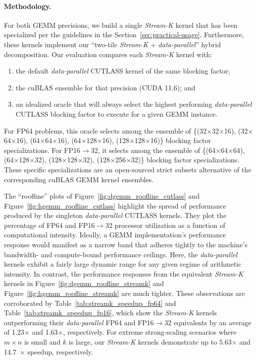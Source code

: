 \paragraph{Methodology.} For both GEMM precisions, we build a single \emph{Stream-K} kernel that has been specialized per the guidelines in the Section~\ref{sec:practical-usage}.
Furthermore, these kernels implement our ``two-tile \emph{Stream-K} +
\emph{data-parallel}'' hybrid decomposition. Our evaluation compares each \emph{Stream-K} kernel with:

\begin{enumerate}
    \item the default \emph{data-parallel} CUTLASS kernel of the same blocking factor;
    \item the cuBLAS ensemble for that precision (CUDA 11.6); and \item an idealized oracle that will always select the highest performing \emph{data-parallel} CUTLASS blocking factor to execute for a given GEMM instance.
\end{enumerate}

For FP64 problems, this oracle selects among the ensemble of \{(32$\times$32$\times$16), (32$\times$64$\times$16),
(64$\times$64$\times$16), (64$\times$128$\times$16), (128$\times$128$\times$16)\}
blocking factor specializations.  For FP16$\rightarrow$32, it selects among the ensemble of \{(64$\times$64$\times$64), (64$\times$128$\times$32),
(128$\times$128$\times$32), (128$\times$256$\times$32)\} blocking factor specializations. These specific specializations are an open-sourced strict subsets alternative of the corresponding cuBLAS GEMM kernel ensembles.

The ``roofline'' plots of Figure~\ref{fig:dgemm_roofline_cutlass} and
Figure~\ref{fig:hgemm_roofline_cutlass} highlight the spread of performance produced by the singleton \emph{data-parallel} CUTLASS kernels. They plot the percentage of FP64 and FP16$\rightarrow$32 processor utilization as a function of computational intensity. Ideally, a GEMM implementation's performance response would manifest as a narrow band that adheres tightly to the machine's bandwidth- and compute-bound performance ceilings. Here, the
\emph{data-parallel} kernels exhibit a fairly large dynamic range for any given regime of arithmetic intensity.  In contrast, the performance responses from the equivalent \emph{Stream-K} kernels in Figure~\ref{fig:dgemm_roofline_streamk}
and Figure~\ref{fig:hgemm_roofline_streamk} are much tighter. These observations are corroborated by Table~\ref{tab:streamk_speedup_fp64}
and Table~\ref{tab:streamk_speedup_fp16}, which show the \emph{Stream-K}
kernels outperforming their \emph{data-parallel} FP64 and FP16$\rightarrow$32
equivalents by an average of 1.23$\times$ and 1.63$\times$, respectively. For extreme strong-scaling scenarios where $m \times n$ is small and $k$ is large, our \emph{Stream-K} kernels demonstrate up to 5.63$\times$ and
14.7~$\times$ speedup, respectively.

